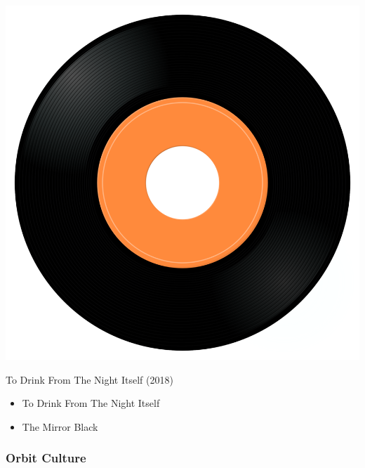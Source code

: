 \begin{minipage}[t]{0.25\textwidth}\vspace{0pt}
\captionsetup{type=figure}
\includegraphics[width=\textwidth]{Images/cover.png}
\caption*{To Drink From The Night Itself (2018)}
\end{minipage}
\begin{minipage}[t]{0.25\textwidth}\vspace{0pt}
\begin{itemize}[nosep,leftmargin=1em,labelwidth=*,align=left]
	\setlength{\itemsep}{0pt}
	\item To Drink From The Night Itself
	\item The Mirror Black
\end{itemize}
\end{minipage}

\subsubsection{Orbit Culture}


